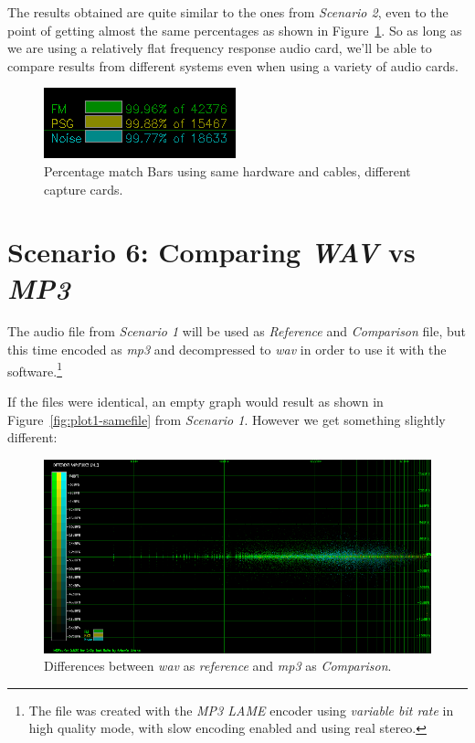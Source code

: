 \documentclass[10pt,a4paper]{report}
\newcommand{\ac}[1]{\textit{\mbox{\acrshort{#1}}}}
\begin{document}
The results obtained are quite similar to the ones from \textit{Scenario 2}, even to the point of getting almost the same percentages as shown in Figure~\ref{fig:plot5-3-bars}. So as long as we are using a relatively flat frequency response audio card, we'll be able to compare results from different systems even when using a variety of audio cards.

\begin{figure}[H]
	\centering
	\includegraphics[width=0.4\linewidth]{images/interpretation/Plot5-3-bars.png}
	\caption[Different sound cards Bars]{Percentage match Bars using same hardware and cables, different capture cards.}
	\label{fig:plot5-3-bars}
\end{figure}

\section{Scenario 6: Comparing \textit{WAV} vs \textit{MP3}}
\label{mp3chap}

The audio file from \textit{Scenario 1} will be used as \textit{Reference} and \textit{Comparison} file, but this time encoded as \ac{mp3} and decompressed to \ac{wav} in order to use it with the software.\footnote{The file was created with the \textit{MP3 LAME} encoder using \textit{variable bit rate} in high quality mode, with slow encoding enabled and using real stereo.}

If the files were identical, an empty graph would result as shown in Figure~\ref{fig:plot1-samefile} from \textit{Scenario 1}. However we get something slightly different:

\begin{figure}[H]
	\centering
	\includegraphics[width=1.0\linewidth]{images/interpretation/Plot6-mp3-1.png}
	\caption[WAV vs MP3]{Differences between \ac{wav} as \textit{reference} and \ac{mp3} as \textit{Comparison}.}
	\label{fig:plot6-mp3-1}
\end{figure}
\end{document}
